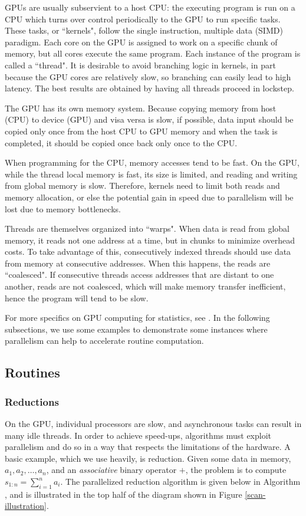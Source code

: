 {GPUs are usually subservient to a host CPU: the executing program is run on a CPU which turns over control periodically to the GPU to run specific tasks. These tasks, or ``kernels", follow the single instruction, multiple data (SIMD) paradigm. Each core on the GPU is assigned to work on a specific chunk of memory, but all cores execute the same program. Each instance of the program is called a ``thread". It is desirable to avoid branching logic in kernels, in part because the GPU cores are relatively slow, so branching can easily lead to high latency. The best results are obtained by having all threads proceed in lockstep.

The GPU has its own memory system. Because copying memory from host (CPU) to device (GPU) and visa versa is slow, if possible, data input should be copied only once from the host CPU to GPU memory and when the task is completed, it should be copied once back only once to the CPU.

When programming for the CPU, memory accesses tend to be fast. On the GPU, while the thread local memory is fast, its size is limited, and reading and writing from global memory is slow. Therefore, kernels need to limit both reads and memory allocation, or else the potential gain in speed due to parallelism will be lost due to memory bottlenecks.

Threads are themselves organized into ``warps". When data is read from global memory, it reads not one address at a time, but in chunks to minimize overhead costs. To take advantage of this, consecutively indexed threads should use data from memory at consecutive addresses. When this happens, the reads are ``coalesced". If consecutive threads access addresses that are distant to one another, reads are not coalesced, which will make memory transfer inefficient, hence the program will tend to be slow.

For more specifics on GPU computing for statistics, see \citet{suchard2010}. In the following subsections, we use some examples to demonstrate some instances where parallelism can help to accelerate routine computation.

\subsection{Routines}
\label{sec:routines}
\subsubsection{Reductions}
\label{subsec:reduce}
On the GPU, individual processors are slow, and asynchronous tasks can result in many idle threads. In order to achieve speed-ups, algorithms must exploit parallelism and do so in a way that respects the limitations of the hardware. A basic example, which we use heavily, is reduction. Given some data in memory, $a_1, a_2, \ldots, a_n$, and an \textit{associative} binary operator $+$, the problem is to compute $s_{1:n}=\sum_{i=1}^n a_i$. The parallelized reduction algorithm is given below in Algorithm \label{reduce}, and is illustrated in the top half of the diagram shown in Figure \ref{scan-illustration}.  

}
